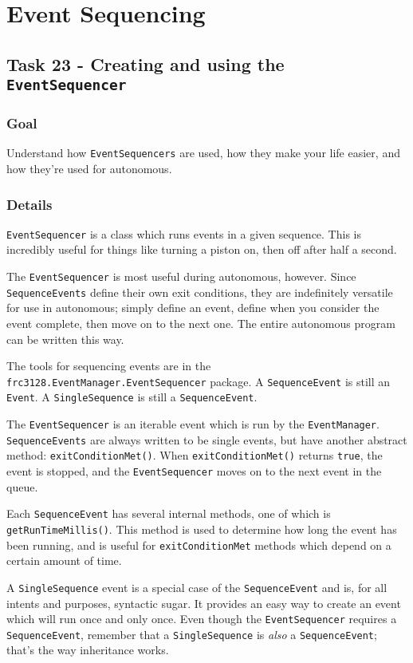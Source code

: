 \documentclass[a4paper]{article}
\begin{document}
\section{Event Sequencing}

\subsection{Task 23 - Creating and using the \lstinline{EventSequencer}}
\subsubsection{Goal} Understand how \lstinline{EventSequencers} are used, how they make your life easier, and how they're used for autonomous.
\subsubsection{Details} \lstinline{EventSequencer} is a class which runs events in a given sequence. This is incredibly useful for things like turning a piston on, then off after half a second.

The \lstinline{EventSequencer} is most useful during autonomous, however. Since \lstinline{SequenceEvents} define their own exit conditions, they are indefinitely versatile for use in autonomous; simply define an event, define when you consider the event complete, then move on to the next one. The entire autonomous program can be written this way. 

The tools for sequencing events are in the \lstinline{frc3128.EventManager.EventSequencer} package. A \lstinline{SequenceEvent} is still an \lstinline{Event}. A \lstinline{SingleSequence} is still a \lstinline{SequenceEvent}.

The \lstinline{EventSequencer} is an iterable event which is run by the \lstinline{EventManager}. \lstinline{SequenceEvents} are always written to be single events, but have another abstract method: \lstinline{exitConditionMet()}. When \lstinline{exitConditionMet()} returns \lstinline{true}, the event is stopped, and the \lstinline{EventSequencer} moves on to the next event in the queue.

Each \lstinline{SequenceEvent} has several internal methods, one of which is \lstinline{getRunTimeMillis()}. This method is used to determine how long the event has been running, and is useful for \lstinline{exitConditionMet} methods which depend on a certain amount of time.

A \lstinline{SingleSequence} event is a special case of the \lstinline{SequenceEvent} and is, for all intents and purposes, syntactic sugar. It provides an easy way to create an event which will run once and only once. Even though the \lstinline{EventSequencer} requires a \lstinline{SequenceEvent}, remember that a \lstinline{SingleSequence} is \textit{also} a \lstinline{SequenceEvent}; that's the way inheritance works.
\end{document}
